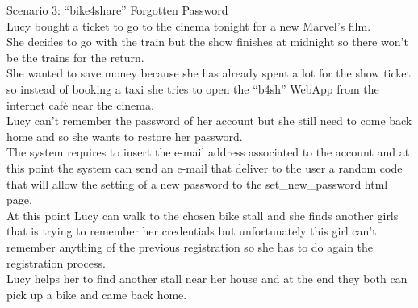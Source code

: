 \documentclass{article}
\begin{document}
Scenario 3: “bike4share” Forgotten Password \\
Lucy bought a ticket to go to the cinema tonight for a new Marvel’s film.\\ She decides to go with the train but the show finishes at midnight so there won’t be the trains for the return.\\ 
She wanted to save money because she has already spent a lot for the show ticket so instead of booking a taxi she tries to open the “b4sh” WebApp from the internet cafè near the cinema.\\Lucy can’t remember the password of her account but she still need to come back home and so she wants to restore her password.\\ The system requires to insert the e-mail address associated to the account and at this point the system can send an e-mail that deliver to the user a random code that will allow the setting of a new password to the set\_new\_password html page. \\ At this point Lucy can walk to the chosen bike stall and she finds another girls that is trying to remember her credentials but unfortunately this girl can’t remember anything of the previous registration so she has to do again the registration process.\\Lucy helps her to find another stall near her house and at the end they both can pick up a bike and came back home.
\end{document}
